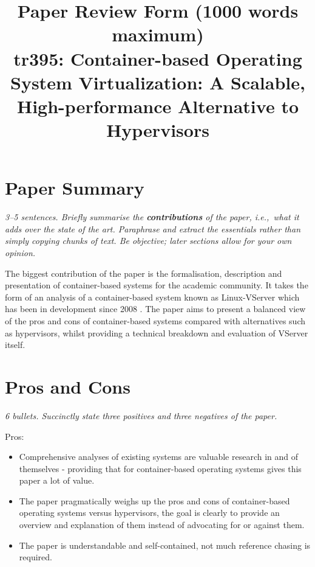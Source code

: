 \documentclass[11pt]{article}
\begin{document}

\title{Paper Review Form (1000 words maximum)\\
    tr395: Container-based Operating System Virtualization: A Scalable, High-performance Alternative to Hypervisors \cite{Containers}}

\maketitle

\section*{Paper Summary}

\textsl{3--5 sentences. Briefly summarise the {\bf contributions} of the paper,
i.e.,~what it adds over the state of the art. Paraphrase and extract the
essentials rather than simply copying chunks of text. Be objective; later
sections allow for your own opinion.}

The biggest contribution of the paper is the formalisation, description and
presentation of container-based systems for the academic community. It takes
the form of an analysis of a container-based system known as Linux-VServer
which has been in development since 2008 \cite{LinuxVServer}. The paper aims to
present a balanced view of the pros and cons of container-based systems
compared with alternatives such as hypervisors, whilst providing a technical
breakdown and evaluation of VServer itself.

\section*{Pros and Cons}

\textsl{6 bullets. Succinctly state three positives and three negatives of the
paper.}

Pros:

\begin{itemize}

    \item Comprehensive analyses of existing systems are valuable research in
    and of themselves - providing that for container-based operating systems
    gives this paper a lot of value.

    \item The paper pragmatically weighs up the pros and cons of
    container-based operating systems versus hypervisors, the goal is clearly
    to provide an overview and explanation of them instead of advocating for or
    against them.

    \item The paper is understandable and self-contained, not much reference
    chasing is required.

\end{itemize}
\end{document}
